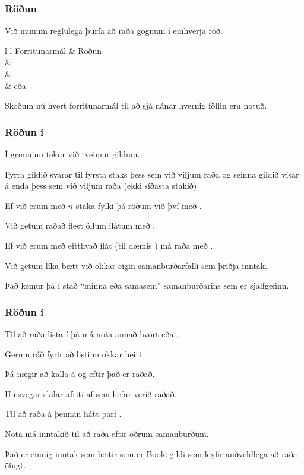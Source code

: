 {
	\frametitle{Röðun}
	{
		\item<1-> Við munum reglulega þurfa að raða gögnum í einhverja röð.
		\item<2->[]
		{
			{l l}
			Forritunarmál & Röðun\\
			\hline
			 & \\
			 & \\
			 &  eða \\
		}
		\item<3-> Skoðum nú hvert forritunarmál til að sjá nánar hvernig föllin eru notuð.
	}
}

{
	\frametitle{Röðun í }
	{
		\item<1-> Í grunninn tekur  við tveimur gildum.
		\item<2-> Fyrra gildið svarar til fyrsta staks þess sem við viljum raða og seinna gildið vísar á enda þess sem við viljum raða
			(ekki síðasta stakið)
		\item<3-> Ef við erum með $n$ staka fylki  þá röðum við því með .
		\item<4-> Við getum raðað flest öllum ílátum með .
		\item<5-> Ef við erum með eitthvað ílát (til dæmis )  má raða með .
		\item<6-> Við getum líka bætt við okkar eigin samanburðarfalli sem þriðja inntak.
		\item<7-> Það kemur þá í stað ``minna eða samasem'' samanburðarins sem er sjálfgefinn.
	}
}

{
	\frametitle{Röðun í }
	{
		\item<1-> Til að raða lista í  þá má nota annað hvort  eða .
		\item<2-> Gerum ráð fyrir að listinn okkar heiti .
		\item<3-> Þá nægir að kalla á  og eftir það er  raðað.
		\item<4-> Hinsvegar skilar  afriti af  sem hefur verið raðað.
		\item<5-> Til að raða  á þennan hátt þarf .
		\item<6-> Nota má inntakið  til að raða eftir öðrum samanburðum.
		\item<7-> Það er einnig inntak sem heitir  sem er Boole gildi sem leyfir auðveldlega að raða öfugt.
	}
}

